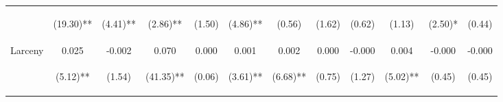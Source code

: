 \begin{tabular}{lccccccccccc}
 & \begin{footnotesize}(19.30)**\end{footnotesize} & \begin{footnotesize}(4.41)**\end{footnotesize} & \begin{footnotesize}(2.86)**\end{footnotesize} & \begin{footnotesize}(1.50)\end{footnotesize} & \begin{footnotesize}(4.86)**\end{footnotesize} & \begin{footnotesize}(0.56)\end{footnotesize} & \begin{footnotesize}(1.62)\end{footnotesize} & \begin{footnotesize}(0.62)\end{footnotesize} & \begin{footnotesize}(1.13)\end{footnotesize} & \begin{footnotesize}(2.50)*\end{footnotesize} & \begin{footnotesize}(0.44)\end{footnotesize}\\
\noalign{\smallskip}Larceny & 0.025 & -0.002 & 0.070 & 0.000 & 0.001 & 0.002 & 0.000 & -0.000 & 0.004 & -0.000 & -0.000\\
 & \begin{footnotesize}(5.12)**\end{footnotesize} & \begin{footnotesize}(1.54)\end{footnotesize} & \begin{footnotesize}(41.35)**\end{footnotesize} & \begin{footnotesize}(0.06)\end{footnotesize} & \begin{footnotesize}(3.61)**\end{footnotesize} & \begin{footnotesize}(6.68)**\end{footnotesize} & \begin{footnotesize}(0.75)\end{footnotesize} & \begin{footnotesize}(1.27)\end{footnotesize} & \begin{footnotesize}(5.02)**\end{footnotesize} & \begin{footnotesize}(0.45)\end{footnotesize} & \begin{footnotesize}(0.45)\end{footnotesize}\\

\end{tabular}
